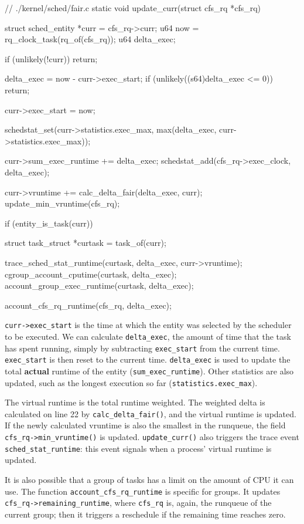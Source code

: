 \label{trace:sched_stat_runtime}
\begin{code}
// ./kernel/sched/fair.c
static void update_curr(struct cfs_rq *cfs_rq)
{
	struct sched_entity *curr = cfs_rq->curr;
	u64 now = rq_clock_task(rq_of(cfs_rq));
	u64 delta_exec;

	if (unlikely(!curr))
		return;

	delta_exec = now - curr->exec_start;
	if (unlikely((s64)delta_exec <= 0))
		return;

	curr->exec_start = now;

	schedstat_set(curr->statistics.exec_max,
		      max(delta_exec, curr->statistics.exec_max));

	curr->sum_exec_runtime += delta_exec;
	schedstat_add(cfs_rq->exec_clock, delta_exec);

	curr->vruntime += calc_delta_fair(delta_exec, curr);
	update_min_vruntime(cfs_rq);

	if (entity_is_task(curr)) {
		struct task_struct *curtask = task_of(curr);

		trace_sched_stat_runtime(curtask, delta_exec, curr->vruntime);
		cgroup_account_cputime(curtask, delta_exec);
		account_group_exec_runtime(curtask, delta_exec);
	}

	account_cfs_rq_runtime(cfs_rq, delta_exec);
}
\end{code}
\verb|curr->exec_start| is the time at which the entity was selected by the scheduler to be executed. %
We can calculate \verb|delta_exec|, the amount of time that the task has spent running, simply by subtracting \verb|exec_start| from the current time. \verb|exec_start| is then reset to the current time. \verb|delta_exec| is used to update the total \textbf{actual} runtime of the entity (\verb|sum_exec_runtime|). Other statistics are also updated, such as the longest execution so far (\verb|statistics.exec_max|).

The virtual runtime is the total runtime weighted. The weighted delta is calculated on line 22 by \verb|calc_delta_fair()|, and the virtual runtime is updated.
If the newly calculated vruntime is also the smallest in the runqueue, the field \verb|cfs_rq->min_vruntime()| is updated.
\verb|update_curr()| also triggers the trace event \verb|sched_stat_runtime|: this event signals when a process' virtual runtime is updated.

It is also possible that a group of tasks has a limit on the amount of CPU it can use. The function \verb|account_cfs_rq_runtime| is specific for groups. It updates \verb|cfs_rq->remaining_runtime|, where \verb|cfs_rq| is, again, the runqueue of the current group; then it triggers a reschedule if the remaining time reaches zero.

